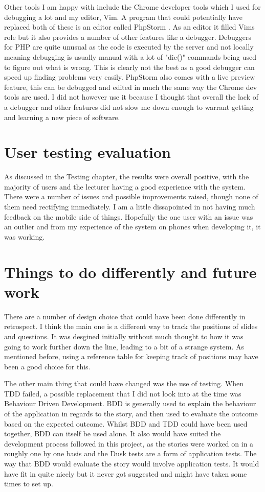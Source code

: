 Other tools I am happy with include the Chrome developer tools which I used for debugging a lot and my editor, Vim. A program that could potentially have replaced both of these is an editor called PhpStorm \cite{phpstorm}. As an editor it filled Vims role but it also provides a number of other features like a debugger. Debuggers for PHP are quite unusual as the code is executed by the server and not locally meaning debugging is usually manual with a lot of "die()" commands being used to figure out what is wrong. This is clearly not the best as a good debugger can speed up finding problems very easily. PhpStorm also comes with a live preview feature, this can be debugged and edited in much the same way the Chrome dev tools are used. I did not however use it because I thought that overall the lack of a debugger and other features did not slow me down enough to warrant getting and learning a new piece of software.

\section{User testing evaluation}
As discussed in the Testing chapter, the results were overall positive, with the majority of users and the lecturer having a good experience with the system. There were a number of issues and possible improvements raised, though none of them need rectifying immediately. I am a little dissapointed in not having much feedback on the mobile side of things. Hopefully the one user with an issue was an outlier and from my experience of the system on phones when developing it, it was working.

\section{Things to do differently and future work}
There are a number of design choice that could have been done differently in retrospect. I think the main one is a different way to track the positions of slides and questions. It was desgined initially without much thought to how it was going to work further down the line, leading to a bit of a strange system. As mentioned before, using a reference table for keeping track of positions may have been a good choice for this.

The other main thing that could have changed was the use of testing. When TDD failed, a possible replacement that I did not look into at the time was Behaviour Driven Development\cite{bdd}. BDD is generally used to explain the behaviour of the application in regards to the story, and then used to evaluate the outcome based on the expected outcome. Whilst BDD and TDD could have been used together, BDD can itself be used alone. It also would have suited the development process followed in this project, as the stories were worked on in a roughly one by one basis and the Dusk tests are a form of application tests. The way that BDD would evaluate the story would involve application tests. It would have fit in quite nicely but it never got suggested and might have taken some times to set up.

